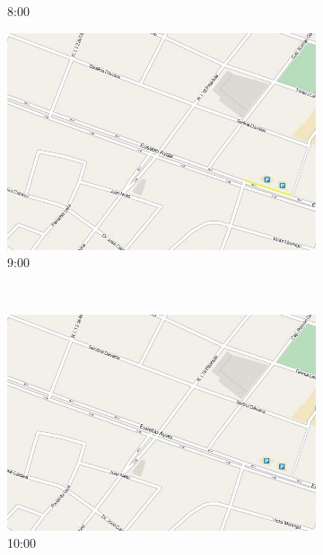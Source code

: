 \begin{figure}[!htbp]
\begin{subfigure}[b]{0.30\textwidth}
		\caption{8:00}
	\end{subfigure}
	
	\begin{subfigure}[b]{0.30\textwidth}
		\includegraphics[width=\textwidth]{capitulos/7/figuras/9.jpg}
		\caption{9:00}
	\end{subfigure}
	~~
	\begin{subfigure}[b]{0.30\textwidth}
		\includegraphics[width=\textwidth]{capitulos/7/figuras/10.jpg}
		\caption{10:00}
	\end{subfigure}
	~~
	\begin{subfigure}[b]{0.30\textwidth}

\end{subfigure}
\end{figure}
